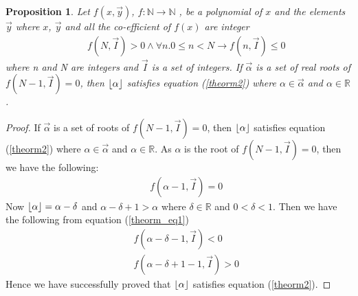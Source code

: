 \documentclass{article}
\DeclarePairedDelimiter\floor{\lfloor}{\rfloor}
\newtheorem{prop}{Proposition}
\begin{document}
\begin{prop}\label{propostion3}
Let $f(x,\vec{y})$, $f:\mathbb{N}\rightarrow \mathbb{N}$ , be a polynomial of $x$ and the elements $\vec{y}$ where $x$, $\vec{y}$ and all the co-efficient of $f(x)$ are integer 
\begin{eqnarray}
	&&f(N,\vec{I})>0 \land \forall n.0\leq n < N \rightarrow f(n,\vec{I})\leq0\label{theorm2}
\end{eqnarray}
where n and N are integers and $\vec{I}$ is a set of integers. If $\vec{\alpha}$ is a set of real roots of $f(N-1,\vec{I})=0$, then $\floor*{\alpha}$ satisfies equation (\ref{theorm2}) where $\alpha \in \vec{\alpha}$ and $\alpha \in \mathbb{R}$.
\end{prop}
\begin{proof}
If $\vec{\alpha}$ is a set of roots of $f(N-1,\vec{I})=0$, then $\floor*{\alpha}$ satisfies equation (\ref{theorm2}) where $\alpha \in \vec{\alpha}$ and $\alpha \in \mathbb{R}$.
As $\alpha$ is the root of $f(N-1,\vec{I})=0$, then we have the following:
    \begin{eqnarray}
    &&f(\alpha-1,\vec{I})=0\label{theorm_eq4}
    \end{eqnarray}
Now $\floor*{\alpha}=\alpha-\delta$ and $\alpha-\delta+1>\alpha$ where $\delta \in \mathbb{R}$ and $0<\delta<1$. Then we have the following from equation (\ref{theorm_eq1})
    \begin{eqnarray}
    &&f(\alpha-\delta-1,\vec{I})<0\label{theorm_eq5}\\
    &&f(\alpha-\delta+1-1,\vec{I})>0\label{theorm_eq6}
    \end{eqnarray}
Hence we have successfully proved that $\floor*{\alpha}$ satisfies equation (\ref{theorm2}).
\end{proof}
\end{document}
